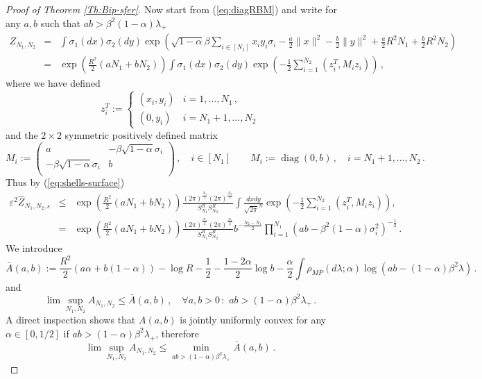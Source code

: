 \documentclass[10pt,oneside,a4paper,reqno]{amsart}  %
\def\be{\begin{equation}}
\def\ee{\end{equation}}
\def\bea{\begin{eqnarray}}
\def\eea{\end{eqnarray}}
\def\nn{\nonumber}
\DeclareMathOperator{\diag}{diag}
\def\a{\alpha}
\def\e{\varepsilon}
\def\b{\beta}
\def\l{\lambda}
\def\r{\rho}
\def\s{\sigma}
\theoremstyle{plain}
\numberwithin{equation}{section}
\begin{document}
\begin{proof}[Proof of Theorem \ref{Th:Bip-sfer}]

Now  start from (\ref{eq:diagRBM}) and write for any $a,b$ such that $ab>\b^2(1-\a)\l_+$
\bea
Z_{N_1,N_2}&=&\int\s_1(dx)\s_2(dy) \exp\left( \sqrt{1-\a} \b\sum_{i\in[N_1]}x_iy_i\s_i-\frac a2 \|x\|^2-\frac b2 \|y\|^2+\frac a2 R^2N_1+\frac b2 R^2N_2\right)\nn\\
&=&\exp\left(\frac {R^2}{2} (aN_1+b N_2)\right) \int\s_1(dx)\s_2(dy)\exp\left( -\frac 1 2 \sum_{i=1}^{N_2} (z_i^T,M_i z_i)\right)\label{eq:repr-Z-RBM}\,,
\eea
where we have defined 
$$
z^T_i := \begin{cases}
(x_i,y_i)&i=1,\ldots , N_1\,,\\
(0,y_i)&i=N_1+1,\ldots , N_2
\end{cases}$$
and the $2\times 2$ symmetric positively defined matrix 
$$
M_i :=
  \left( {\begin{array}{cc}
   a & -\b\sqrt{1-\a}\s_i \\
   -\b\sqrt{1-\a}\s_i & b \\
\end{array} } \right)\,,\quad i\in[N_1]\qquad M_i:=\diag(0,b)\,,\quad i=N_1+1,\ldots , N_2\,.
$$ 
Thus by (\ref{eq:shells-surface})
\bea
\e^2\hat{Z}_{N_1,N_2,\e}&\leq& \exp\left(\frac {R^2}{2} (aN_1+b N_2)\right) \frac{(2\pi)^{\frac{N_1}{2}} (2\pi)^{\frac{N_2}{2}} }{S^R_{N_1} S^R_{N_2}} \int \frac{dx dy}{\sqrt{2\pi}^N}\exp\left( -\frac 12\sum_{i=1}^{N_2} (z_i^T,M_i z_i)\right),\nn\\ 
&=& \exp\left(\frac {R^2}{2} (aN_1+b N_2)\right) \frac{(2\pi)^{\frac{N_1}{2}} (2\pi)^{\frac{N_2}{2}} }{S^R_{N_1} S^R_{N_2}} b^{-\frac{N_2-N_1}{2}} \prod_{i=1}^{N_1}(ab-\b^2(1-\a)\s^2_i)^{-\frac 12}\,.
\eea
We introduce
\be\label{eq:RBM-trial}
\bar A(a,b):= \frac {R^2}{2} (a\a+b(1-\a))-\log R-\frac12-\frac{1-2\a}{2}\log b -\frac{\a}{2}\int \r_{MP}(d\l;\a)\log(ab-(1-\a)\b^2\l)\,.
\ee
and 
$$
\lim\sup_{N_1,N_2}A_{N_1,N_2}\leq \bar A(a,b)\,,\quad \forall a,b>0\,:\,\,ab>(1-\a)\b^2\l_+\,. 
$$
A direct inspection shows that $A(a,b)$ is jointly uniformly convex for any $\a\in[0,1/2]$ if $ab>(1-\a)\b^2\l_+$, therefore
\be\label{eq:upperbound.RBM}
\lim\sup_{N_1,N_2}A_{N_1,N_2}\leq \min_{ab>(1-\a)\b^2\l_+} \bar A(a,b)\,. 
\ee


\end{proof}
\end{document}
